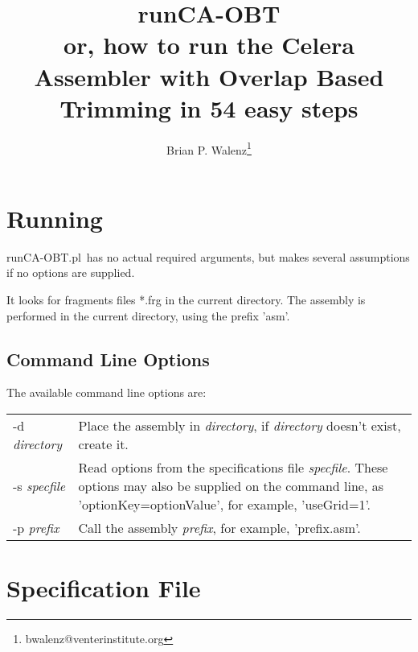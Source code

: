 \documentclass[twoside,11pt]{article}
\begin{document}
\pagestyle{fancy}

\rhead[]{}
\lhead[\today]{\today}

\newcommand{\runCA}{{\sc runCA-OBT.pl}}

\normalem

\title{runCA-OBT\\
{\small or, how to run the Celera Assembler with Overlap Based Trimming in 54 easy steps}}
\author{Brian P. Walenz\thanks{bwalenz@venterinstitute.org}}

\maketitle



\section{Running}

\runCA\ has no actual required arguments, but makes several assumptions
if no options are supplied.

It looks for fragments files *.frg in the current directory.  The
assembly is performed in the current directory, using the prefix
'asm'.

\subsection{Command Line Options}

The available command line options are:

\begin{tabular}{lp{4.0in}}
-d {\it directory} &
Place the assembly in {\it directory}, if {\it directory} doesn't exist,
create it.
\\
-s {\it specfile} &
Read options from the specifications file {\it specfile}.  These options
may also be supplied on the command line, as 'optionKey=optionValue',
for example, 'useGrid=1'.
\\
-p {\it prefix} &
Call the assembly {\it prefix}, for example, 'prefix.asm'.
\end{tabular}

\section{Specification File}
\end{document}

